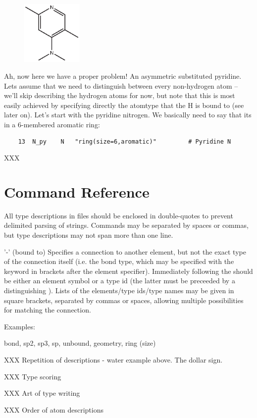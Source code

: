\begin{figure} \includegraphics[width=3cm]{figures/aromatic.eps} \end{figure}
Ah, now here we have a proper problem! An asymmetric substituted pyridine. Lets assume that we need to distinguish between every non-hydrogen atom  -- we'll skip describing the hydrogen atoms for now, but note that this is most easily achieved by specifying directly the atomtype that the H is bound to (see later on). Let's start with the pyridine nitrogen. We basically need to say that its in a 6-membered aromatic ring:

\begin{verbatim}
    13	N_py	N	"ring(size=6,aromatic)"			# Pyridine N
\end{verbatim}

XXX

\section{Command Reference}
\label{sec:typingcommands}

All type descriptions in files should be enclosed in double-quotes to prevent delimited parsing of strings. Commands may be separated by spaces or commas, but type descriptions may not span more than one line.

'-' (bound to)
Specifies a connection to another element, but not the exact type of the connection itself (i.e. the bond type, which may be specified with the  keyword in brackets after the element specifier). Immediately following the \qte{--} should be either an element symbol or a type id (the latter must be preceeded by a distinguishing \qte{\$}). Lists of the elements/type ids/type names may be given in square brackets, separated by commas or spaces, allowing multiple possibilities for matching the connection.

Examples:



bond, sp2, sp3, sp, unbound, geometry, ring (size)


XXX Repetition of descriptions - water example above. The dollar sign.

XXX Type scoring

XXX Art of type writing

XXX Order of atom descriptions


